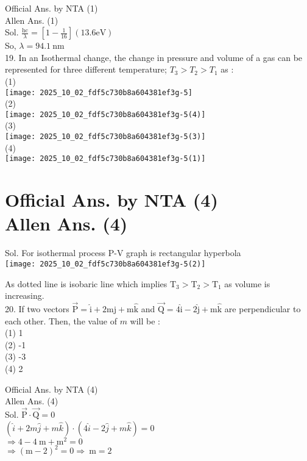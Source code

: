 \documentclass[10pt]{article}
\begin{document}
Official Ans. by NTA (1)\\
Allen Ans. (1)\\
Sol. \(\frac{\mathrm{hc}}{\lambda}=\left[1-\frac{1}{16}\right](13.6 \mathrm{eV})\)\\
So, \(\lambda=94.1 \mathrm{~nm}\)\\
19. In an Isothermal change, the change in pressure and volume of a gas can be represented for three different temperature; \(T_{3}>T_{2}>T_{1}\) as :\\
(1)\\
\texttt{[image: 2025\_10\_02\_fdf5c730b8a604381ef3g-5]}\\
(2)\\
\texttt{[image: 2025\_10\_02\_fdf5c730b8a604381ef3g-5(4)]}\\
(3)\\
\texttt{[image: 2025\_10\_02\_fdf5c730b8a604381ef3g-5(3)]}\\
(4)\\
\texttt{[image: 2025\_10\_02\_fdf5c730b8a604381ef3g-5(1)]}

\section*{Official Ans. by NTA (4) \\
 Allen Ans. (4)}
Sol. For isothermal process P-V graph is rectangular hyperbola\\
\texttt{[image: 2025\_10\_02\_fdf5c730b8a604381ef3g-5(2)]}

As dotted line is isobaric line which implies \(\mathrm{T}_{3}>\mathrm{T}_{2}>\mathrm{T}_{1}\) as volume is increasing.\\
20. If two vectors \(\overrightarrow{\mathrm{P}}=\hat{\mathrm{i}}+2 \mathrm{mj}+\mathrm{m} \hat{\mathrm{k}}\) and \(\overrightarrow{\mathrm{Q}}=4 \hat{\mathrm{i}}-2 \hat{\mathrm{j}}+\mathrm{m} \hat{\mathrm{k}}\) are perpendicular to each other. Then, the value of \(m\) will be :\\
(1) 1\\
(2) -1\\
(3) -3\\
(4) 2

Official Ans. by NTA (4)\\
Allen Ans. (4)\\
Sol. \(\overrightarrow{\mathrm{P}} \cdot \overrightarrow{\mathrm{Q}}=0\)\\
\((\hat{i}+2 m \hat{j}+m \hat{k}) \cdot(4 \hat{i}-2 \hat{j}+m \hat{k})=0\)\\
\(\Rightarrow 4-4 \mathrm{~m}+\mathrm{m}^{2}=0\)\\
\(\Rightarrow(\mathrm{m}-2)^{2}=0 \Rightarrow \mathrm{~m}=2\)
\end{document}
